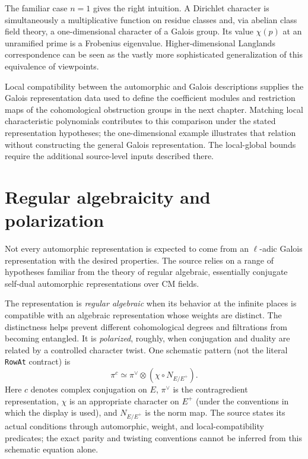 \documentclass[11pt,openany,oneside]{scrbook}
\theoremstyle{definition}
\theoremstyle{remark}
\begin{document}
The familiar case $n=1$ gives the right intuition. A Dirichlet character is simultaneously a multiplicative function on residue classes and, via abelian class field theory, a one-dimensional character of a Galois group. Its value $\chi(p)$ at an unramified prime is a Frobenius eigenvalue. Higher-dimensional Langlands correspondence can be seen as the vastly more sophisticated generalization of this equivalence of viewpoints.

Local compatibility between the automorphic and Galois descriptions supplies the Galois representation data used to define the coefficient modules and restriction maps of the cohomological obstruction groups in the next chapter. Matching local characteristic polynomials contributes to this comparison under the stated representation hypotheses; the one-dimensional example illustrates that relation without constructing the general Galois representation. The local-global bounds require the additional source-level inputs described there.

\section{Regular algebraicity and polarization}

Not every automorphic representation is expected to come from an $\ell$-adic Galois representation with the desired properties. The source relies on a range of hypotheses familiar from the theory of regular algebraic, essentially conjugate self-dual automorphic representations over CM fields.

The representation is \emph{regular algebraic} when its behavior at the infinite places is compatible with an algebraic representation whose weights are distinct. The distinctness helps prevent different cohomological degrees and filtrations from becoming entangled. It is \emph{polarized}, roughly, when conjugation and duality are related by a controlled character twist. One schematic pattern (not the literal \texttt{RowAt} contract) is
\begin{equation}\label{eq:polar}
\pi^c\simeq\pi^\vee\otimes(\chi\circ N_{E/E^+}).
\end{equation}
Here $c$ denotes complex conjugation on $E$, $\pi^\vee$ is the contragredient representation, $\chi$ is an appropriate character on $E^+$ (under the conventions in which the display is used), and $N_{E/E^+}$ is the norm map. The source states its actual conditions through automorphic, weight, and local-compatibility predicates; the exact parity and twisting conventions cannot be inferred from this schematic equation alone.
\end{document}
